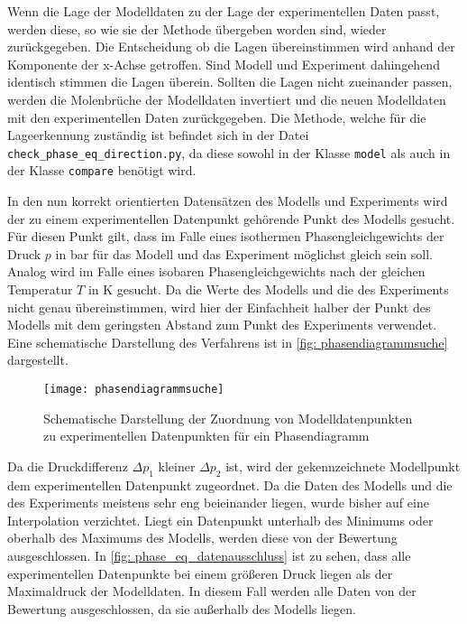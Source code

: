 \documentclass[../thesis.tex]{subfiles}
\begin{document}
Wenn die Lage der Modelldaten zu der Lage der experimentellen Daten passt, werden diese, so wie sie der Methode übergeben worden sind, wieder zurückgegeben. Die Entscheidung ob die Lagen übereinstimmen wird anhand der Komponente der x-Achse getroffen. Sind Modell und Experiment dahingehend identisch stimmen die Lagen überein. Sollten die Lagen nicht zueinander passen, werden die Molenbrüche der Modelldaten invertiert und die neuen Modelldaten mit den experimentellen Daten zurückgegeben. Die Methode, welche für die Lageerkennung zuständig ist befindet sich in der Datei \texttt{check\_phase\_eq\_direction.py}, da diese sowohl in der Klasse \texttt{model} als auch in der Klasse \texttt{compare} benötigt wird.

In den nun korrekt orientierten Datensätzen des Modells und Experiments wird der zu einem experimentellen Datenpunkt gehörende Punkt des Modells gesucht. 
Für diesen Punkt gilt, dass im Falle eines isothermen Phasengleichgewichts der Druck $ p $ in bar für das Modell und das Experiment möglichst gleich sein soll.
Analog wird im Falle eines isobaren Phasengleichgewichts nach der gleichen Temperatur $ T $ in K gesucht. Da die Werte des Modells und die des Experiments nicht genau übereinstimmen, wird hier der Einfachheit halber der Punkt des Modells mit dem geringsten Abstand zum Punkt des Experiments verwendet. Eine schematische Darstellung des Verfahrens ist in \autoref{fig: phasendiagrammsuche} dargestellt. 

\begin{figure}[htb]
	\centering
	\texttt{[image: phasendiagrammsuche]}
	\caption{Schematische Darstellung der Zuordnung von Modelldatenpunkten zu experimentellen Datenpunkten für ein Phasendiagramm}
	\label{fig: phasendiagrammsuche}
\end{figure}

Da die Druckdifferenz $\Delta p_1$ kleiner $ \Delta p_2$ ist, wird der gekennzeichnete Modellpunkt dem experimentellen Datenpunkt zugeordnet. Da die Daten des Modells und die des Experiments meistens sehr eng beieinander liegen, wurde bisher auf eine Interpolation verzichtet. Liegt ein Datenpunkt unterhalb des Minimums oder oberhalb des Maximums des Modells, werden diese von der Bewertung ausgeschlossen. In \autoref{fig: phase_eq_datenausschluss} ist zu sehen, dass alle experimentellen Datenpunkte bei einem größeren Druck liegen als der Maximaldruck der Modelldaten. In diesem Fall werden alle Daten von der Bewertung ausgeschlossen, da sie außerhalb des Modells liegen.
\end{document}
